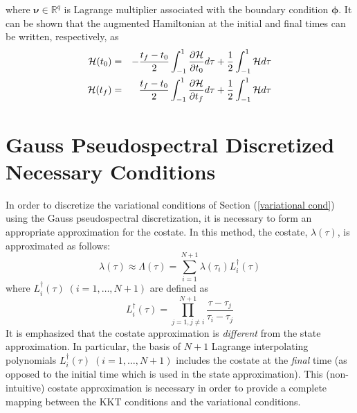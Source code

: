 \documentclass[10pt,final]{report}
\begin{document}
where $\boldsymbol{\nu} \in\mathbb{R}^q$ is Lagrange multiplier
associated with the boundary condition $\boldsymbol{\phi}$.  It can be
shown that the augmented Hamiltonian at the initial and final times
can be written, respectively, as
\begin{eqnarray}
  {\cal H}(t_0) & =& -\frac{t_f - t_0}{2}\int_{-1}^1 \frac{
    \partial {\cal H}}{\partial t_0}d\tau +
  \frac{1}{2}\int_{-1}^1 {\cal H} d\tau
  \label{initial Hamiltonian} \\
  {\cal H}(t_f) & = &  \frac{t_f - t_0}{2}\int_{-1}^1 \frac{
      \partial {\cal H}}{\partial t_f}d\tau +
    \frac{1}{2}\int_{-1}^1 {\cal H} d\tau
    \label{final Hamiltonian}
\end{eqnarray}

\section{Gauss Pseudospectral Discretized Necessary Conditions\label{Disc Nec Cond}}

In order to discretize the variational conditions of Section
(\ref{variational cond}) using the Gauss pseudospectral
discretization, it is necessary to form an appropriate approximation
for the costate.  In this method, the costate, $\lambda(\tau)$, is
approximated as follows:
\begin{equation}
  \lambda(\tau) \approx \Lambda(\tau) =   \sum_{i=1}^{N+1}
  \lambda(\tau_i) L_i^\dag(\tau)
  \label{costate approximation}
\end{equation}
where $L_i^{\dag}(\tau)\;(i=1,\ldots,N+1)$ are defined as
\begin{equation}
  L_i^{\dag}(\tau) = \displaystyle \prod_{j=1,j\neq i}^{N+1}
  \frac{\tau-\tau_j}{\tau_i-\tau_j}
  \label{lagrange for costate}
\end{equation}
It is emphasized that the costate approximation is {\em different}
from the state approximation.  In particular, the basis of $N+1$
Lagrange interpolating polynomials
$L_i^{\dag}(\tau)\;(i=1,\ldots,N+1)$ includes the costate at the
{\em final} time (as opposed to the initial time which is used in the
state approximation).  This (non-intuitive) costate approximation is
necessary in order to provide a complete mapping between the KKT
conditions and the variational conditions.
\end{document}
